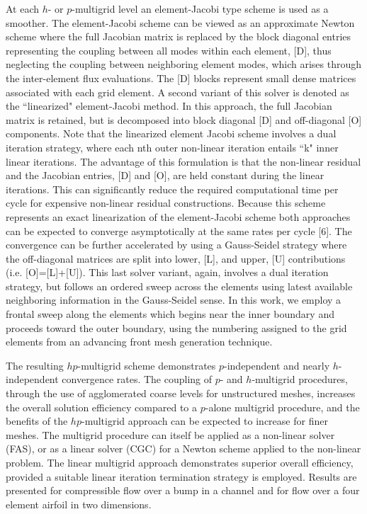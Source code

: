 \documentclass[twosided]{report}
\begin{document}
At each $h$- or $p$-multigrid level an element-Jacobi type scheme is used
as a smoother. The element-Jacobi scheme can be viewed as an
approximate Newton scheme where the full Jacobian matrix is replaced by
the block diagonal entries representing the coupling between all modes
within each element, [D], thus neglecting the coupling between
neighboring element modes, which arises through the inter-element flux
evaluations. The [D] blocks represent small dense matrices associated
with each grid element. A second variant of this solver is denoted as
the ``linearized" element-Jacobi method. In this approach, the full
Jacobian matrix is retained, but is decomposed into block diagonal [D]
and off-diagonal [O] components. Note that the linearized element
Jacobi scheme involves a dual iteration strategy, where each nth outer
non-linear iteration entails ``k" inner linear iterations. The
advantage of this formulation is that the non-linear residual and the
Jacobian entries, [D] and [O], are held constant during the linear
iterations. This can significantly reduce the required computational
time per cycle for expensive non-linear residual constructions. Because
this scheme represents an exact linearization of the element-Jacobi
scheme both approaches can be expected to converge asymptotically at
the same rates per cycle [6]. The convergence can be further
accelerated by using a Gauss-Seidel strategy where the off-diagonal
matrices are split into lower, [L], and upper, [U] contributions (i.e.
[O]=[L]+[U]). This last solver variant, again, involves a dual
iteration strategy, but follows an ordered sweep across the elements
using latest available neighboring information in the Gauss-Seidel
sense. In this work, we employ a frontal sweep along the elements which
begins near the inner boundary and proceeds toward the outer boundary,
using the numbering assigned to the grid elements from an advancing
front mesh generation technique.

The resulting $hp$-multigrid scheme demonstrates $p$-independent and nearly
$h$-independent convergence rates. The coupling of $p$- and $h$-multigrid
procedures, through the use of agglomerated coarse levels for
unstructured meshes, increases the overall solution efficiency compared
to a $p$-alone multigrid procedure, and the benefits of the $hp$-multigrid
approach can be expected to increase for finer meshes. The multigrid
procedure can itself be applied as a non-linear solver (FAS), or as a
linear solver (CGC) for a Newton scheme applied to the non-linear
problem. The linear multigrid approach demonstrates superior overall
efficiency, provided a suitable linear iteration termination strategy
is employed. Results are presented for compressible flow over a bump in
a channel and for flow over a four element airfoil in two dimensions.
\end{document}
